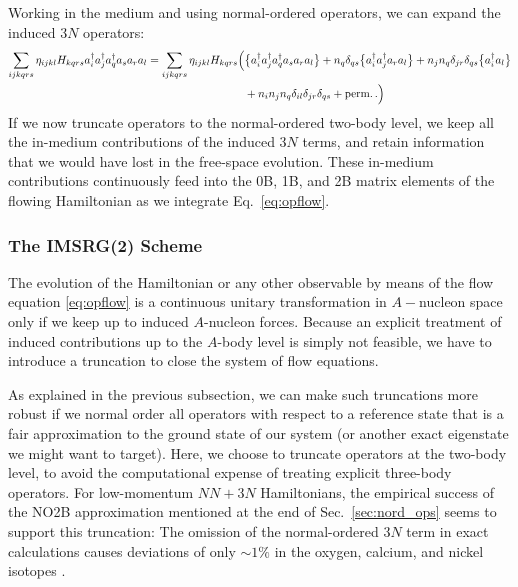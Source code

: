 Working in the medium and using normal-ordered operators, we can expand the 
induced $3N$ operators:
\begin{align}\label{eq:induced_3N_no}
  \sum_{ijkqrs}\eta_{ijkl}H_{kqrs} \aaO_{i}\aaO_{j}\aaO_{q}\aO_{s}\aO_{r}\aO_{l}
  =\sum_{ijkqrs}\eta_{ijkl}H_{kqrs} 
    \Big(&
      \nord{\aaO_{i}\aaO_{j}\aaO_{q}\aO_{s}\aO_{r}\aO_{l}} 
       + n_q\delta_{qs}\nord{\aaO_{i}\aaO_{j}\aO_{r}\aO_{l}} 
       + n_j n_q\delta_{jr}\delta_{qs}\nord{\aaO_{i}\aO_{l}} \notag\\
  &
       + n_in_j n_q\delta_{il}\delta_{jr}\delta_{qs}+ \text{perm.}\,.
    \Big)
\end{align}
If we now truncate operators to the normal-ordered two-body level, we keep
all the in-medium contributions of the induced $3N$ terms, and retain 
information that we would have lost in the free-space evolution. These
in-medium contributions continuously feed into the 0B, 1B, and 2B matrix 
elements of the flowing Hamiltonian as we integrate Eq.~\eqref{eq:opflow}.

%
%
\subsubsection{The IMSRG(2) Scheme}
The evolution of the Hamiltonian or any other observable by means of
the flow equation \eqref{eq:opflow} is a continuous unitary transformation
in $A-$nucleon space only if we keep up to induced $A$-nucleon 
forces. Because an explicit treatment of induced contributions up to the 
$A$-body level is simply not feasible, we have to introduce a truncation 
to close the system of flow equations.

As explained in the previous subsection, we can make such truncations 
more robust if we normal order all operators with respect to a reference
state that is a fair approximation to the ground state of our system
(or another exact eigenstate we might want to target). Here, we choose
to truncate operators at the two-body level, to avoid the computational
expense of treating explicit three-body operators. For low-momentum $NN+3N$
Hamiltonians, the empirical success of the NO2B approximation mentioned 
at the end of Sec.~\ref{sec:nord_ops} seems to support this truncation: 
The omission of the normal-ordered $3N$ term in exact calculations causes 
deviations of only $\sim1\%$ in the oxygen, calcium, and nickel isotopes
\cite{Roth:2012qf,Binder:2013fk,Binder:2014fk}.

